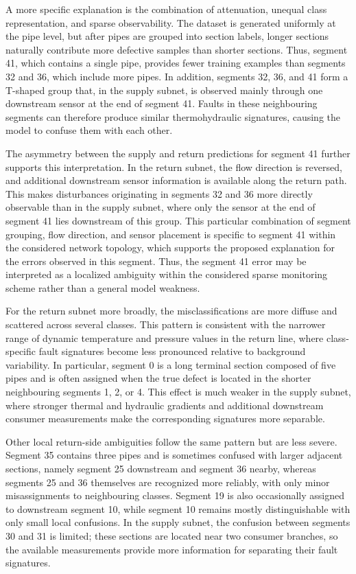 \documentclass[energies,article,submit,pdftex,moreauthors]{Definitions/mdpi}
\newif\ifshowrevisions
\newcommand{\revisionstyle}[1]{\textcolor{blue}{#1}}
\newcommand{\revision}[1]{\ifshowrevisions\revisionstyle{#1}\else#1\fi}
\begin{document}
A more specific explanation is the combination of attenuation, unequal class representation, and sparse observability. The dataset is generated uniformly at the pipe level, but after pipes are grouped into section labels, longer sections naturally contribute more defective samples than shorter sections. Thus, segment 41, which contains a single pipe, provides fewer training examples than segments 32 and 36, which include more pipes. In addition, segments 32, 36, and 41 form a T-shaped group that, in the supply subnet, is observed mainly through one downstream sensor at the end of segment 41. Faults in these neighbouring segments can therefore produce similar thermohydraulic signatures, causing the model to confuse them with each other.

The asymmetry between the supply and return predictions for segment 41 further supports this interpretation. In the return subnet, the flow direction is reversed, and additional downstream sensor information is available along the return path. This makes disturbances originating in segments 32 and 36 more directly observable than in the supply subnet, where only the sensor at the end of segment 41 lies downstream of this group. This particular combination of segment grouping, flow direction, and sensor placement is specific to segment 41 within the considered network topology, which supports the proposed explanation for the errors observed in this segment. Thus, the segment 41 error may be interpreted as a localized ambiguity within the considered sparse monitoring scheme rather than a general model weakness.

For the return subnet more broadly, the misclassifications are more diffuse and scattered across several classes. This pattern is consistent with the narrower range of dynamic temperature and pressure values in the return line, where class-specific fault signatures become less pronounced relative to background variability. In particular, segment 0 is a long terminal section composed of five pipes and is often assigned when the true defect is located in the shorter neighbouring segments 1, 2, or 4. This effect is much weaker in the supply subnet, where stronger thermal and hydraulic gradients and additional downstream consumer measurements make the corresponding signatures more separable.

Other local return-side ambiguities follow the same pattern but are less severe. Segment 35 contains three pipes and is sometimes confused with larger adjacent sections, namely segment 25 downstream and segment 36 nearby, whereas segments 25 and 36 themselves are recognized more reliably, with only minor misassignments to neighbouring classes. Segment 19 is also occasionally assigned to downstream segment 10, while segment 10 remains mostly distinguishable with only small local confusions. In the supply subnet, the confusion between segments 30 and 31 is limited; these sections are located near two consumer branches, so the available measurements provide more information for separating their fault signatures.
\end{document}
